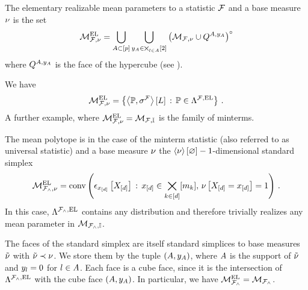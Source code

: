 \begin{definition}
    \label{def:elementaryRealizableMeanParams}
    The elementary realizable mean parameters to a statistic $\mathcal{F}$ and a base measure $\nu$ is the set
    \begin{align*}
        \mathcal{M}^{\mathrm{EL}}_{\mathcal{F},\nu}
        = \bigcup_{A\subset[p]} \bigcup_{y_{A}\in\bigtimes_{l\in A}[2]}
        {\left(\mathcal{M}_{\mathcal{F},\nu}\cup Q^{A,y_{A}}\right)}^{\circ}
    \end{align*}
    where $Q^{A,y_{A}}$ is the face of the hypercube (see ).
\end{definition}

We have
\begin{align*}
    \mathcal{M}^{\mathrm{EL}}_{\mathcal{F},\nu}
    = \left\{ \left\langle \mathbb{P},\sigma^{\mathcal{F}}\right\rangle \left[ L \right] \,:\, \mathbb{P}\in\Lambda^{\mathcal{F},\mathrm{EL}} \right\} \, .
\end{align*}
A further example, where $\mathcal{M}^{\mathrm{EL}}_{\mathcal{F},\nu}=\mathcal{M}_{\mathcal{F},\mathbb{I}}$ is the family of minterms.

\begin{example}
    \label{exa:mintermHLNSet}
    The mean polytope is in the case of the minterm statistic (also referred to as universal statistic) and a base measure $\nu$ the $\left\langle \nu\right\rangle \left[ \varnothing \right]-1$-dimensional standard simplex
    \begin{align*}
        \mathcal{M}^{\mathrm{EL}}_{\mathcal{F}_{\land},\nu}
        = \mathrm{conv}\left(\epsilon_{x_{[d]}}\left[X_{[d]}\right]\,:\,x_{[d]}\in\bigtimes_{k\in[d]}[m_{k}],\,\nu\left[X_{[d]}=x_{[d]}\right]=1\right) \, .
    \end{align*}
    In this case, $\Lambda^{\mathcal{F}_{\land},\mathrm{EL}}$ contains any distribution and therefore trivially realizes any mean parameter in $\mathcal{M}_{\mathcal{F}_{\land},\mathbb{I}}$.

    The faces of the standard simplex are itself standard simplices to base measures $\tilde{\nu}$ with $\tilde{\nu}\prec\nu$.
    We store them by the tuple $(A,y_{A})$, where $A$ is the support of $\tilde{\nu}$ and $y_{l}=0$ for $l\in A$.
    Each face is a cube face, since it is the intersection of $\Lambda^{\mathcal{F}_{\land},\mathrm{EL}}$ with the cube face $(A,y_{A})$.
    In particular, we have $\mathcal{M}^{\mathrm{EL}}_{\mathcal{F}_{\land}}=\mathcal{M}_{\mathcal{F}_{\land}}$.
\end{example}


